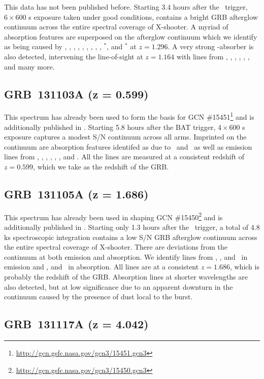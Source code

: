 \documentclass{aa}    %
\begin{document}
This data has not been published before. Starting 3.4 hours after the
\swift~trigger, $6\times600$ s exposure taken under good conditions, contains a
bright GRB afterglow continuum across the entire spectral coverage of X-shooter.
A myriad of absorption features are superposed on the afterglow continuum which
we identify as being caused by \SIiv, \SIii, \civ, \alii, \aliii, \znii, \crii,
\NIii, \feii, \NIii$^*$, and \feii$^*$ at $z = 1.296$. A very strong
\mgii-absorber is also detected, intervening the line-of-sight at $z = 1.164$
with lines from \SIii, \civ, \aliii, \aliii, \feii, \mnii, and many more.

\subsection{GRB~131103A (z = 0.599)}	

This spectrum has already been used to form the basis for GCN
\#15451\footnote{\url{http://gcn.gsfc.nasa.gov/gcn3/15451.gcn3}} and is
additionally published in \citet{Kruhler2015}. Starting 5.8 hours after the BAT
trigger, $4\times600$ s exposure captures a modest S/N continuum across all
arms. Imprinted on the continuum are absorption features identifed as due to
\feii~and \mgii~as well as emission lines from \oii, \hd, \hg, \hb, \oiii, \ha,
and \nii. All the lines are measured at a consistent redshift of $z = 0.599$,
which we take as the redshift of the GRB.

\subsection{GRB~131105A (z = 1.686)}	

This spectrum has already been used in shaping GCN
\#15450\footnote{\url{http://gcn.gsfc.nasa.gov/gcn3/15450.gcn3}} and is
additionally published in \citet{Kruhler2015}. Starting only 1.3 hours after the
\swift~trigger, a total of 4.8 ks spectroscopic integration contains a low S/N
GRB afterglow continuum across the entire spectral coverage of X-shooter. There
are deviations from the continuum at both emission and absorption. We identify
lines from \hb, \oiii, and \ha~in emission and \feii, and \mgii~in absorption.
All lines are at a consistent $z = 1.686$, which is probably the redshift of the
GRB. Absorption lines at shorter wavelengths are also detected, but at low
significance due to an apparent downturn in the continuum caused by the presence
of dust local to the burst.

\subsection{GRB~131117A (z = 4.042)}	
\end{document}
